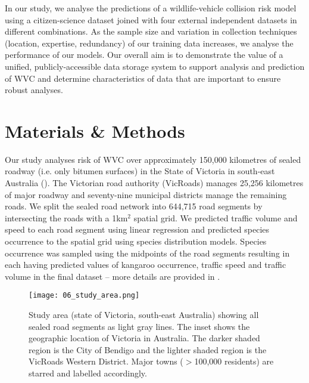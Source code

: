 In our study, we analyse the predictions of a wildlife-vehicle collision risk model using a citizen-science dataset joined with four external independent datasets in different combinations. As the sample size and variation in collection techniques (location, expertise, redundancy) of our training data increases, we analyse the performance of our models. Our overall aim is to demonstrate the value of a unified, publicly-accessible data storage system to support analysis and prediction of WVC and determine characteristics of data that are important to ensure robust analyses.

\section{Materials \& Methods}

Our study analyses risk of WVC over approximately 150,000 kilometres of sealed roadway (i.e. only bitumen surfaces) in the State of Victoria in south-east Australia (). The Victorian road authority (VicRoads) manages 25,256 kilometres of major roadway and seventy-nine municipal districts manage the remaining roads. We split the sealed road network into 644,715 road segments by intersecting the roads with a 1km$^2$ spatial grid. We predicted traffic volume and speed to each road segment using linear regression and predicted species occurrence to the spatial grid using species distribution models. Species occurrence was sampled using the midpoints of the road segments resulting in each having predicted values of kangaroo occurrence, traffic speed and traffic volume in the final dataset -- more details are provided in . 

\begin{figure*}[htp]
  \centering
  \texttt{[image: 06\_study\_area.png]}
  \caption[Study area for model validation]{Study area (state of Victoria, south-east Australia) showing all sealed road segments as light gray lines. The inset shows the geographic location of Victoria in Australia. The darker shaded region is the City of Bendigo and the lighter shaded region is the VicRoads Western District. Major towns ($>$100,000 residents) are starred and labelled accordingly.}
  \label{val_study_area}
\end{figure*}


